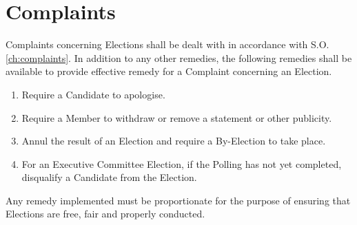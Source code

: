 \section{Complaints}
\npara Complaints concerning Elections shall be dealt with in accordance with S.O. \ref{ch:complaints}.
\npara In addition to any other remedies, the following remedies shall be available to provide effective remedy for a Complaint concerning an Election.
\begin{enumerate}
\item Require a Candidate to apologise.
\item Require a Member to withdraw or remove a statement or other publicity.
\item Annul the result of an Election and require a By-Election to take place.
\item For an Executive Committee Election, if the Polling has not yet completed, disqualify a Candidate from the Election.
\end{enumerate}
\npara Any remedy implemented must be proportionate for the purpose of ensuring that Elections are free, fair and properly conducted.




